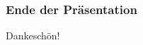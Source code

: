 \documentclass{beamer}
\begin{document}

\begin{frame}
    \frametitle{Ende der Präsentation}
    Dankeschön!
\end{frame}

\end{document}
